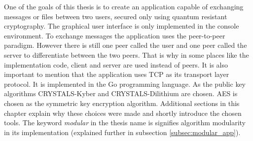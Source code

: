 One of the goals of this thesis is to create an application capable of exchanging messages or files between two users, secured only using quantum resistant cryptography. The graphical user interface is only implemented in the console environment. To exchange messages the application uses the peer-to-peer paradigm. However there is still one peer called the user and one peer called the server to differentiate between the two peers. That is why in some places like the implementation code, client and server are used instead of peers. It is also important to mention that the application uses TCP as its transport layer protocol. It is implemented in the Go programming language. As the public key algorithms CRYSTALS-Kyber and CRYSTALS-Dilithium are chosen. AES is chosen as the symmetric key encryption algorithm. Additional sections in this chapter explain why these choices were made and shortly introduce the chosen tools. The keyword \textit{modular} in the thesis name is signifies algorithm modularity in its implementation (explained further in subsection \ref{subsec:modular_app}).
